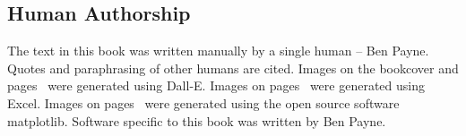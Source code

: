 \begin{center}
\section*{Human Authorship}
\end{center}

The text in this book was written manually by a single human -- Ben Payne. Quotes and paraphrasing of other humans are cited. Images on the bookcover and pages~\pageref{fig:subordinate_and_supervisor,fig:meeting-to-discuss-coordination,fig:toaster_oven} were generated using Dall-E. Images on pages~\pageref{fig:pareto_frontier_cars,fig:hours_per_year} were generated using Excel. Images on pages~\pageref{fig:task-distribution-tasks-per-person,fig:task-distribution-backlog-length,fig:task-distribution-percent-of-tasks,fig:task-distribution-completed-vs-size} were generated using the open source software matplotlib. Software specific to this book was written by Ben Payne. 

